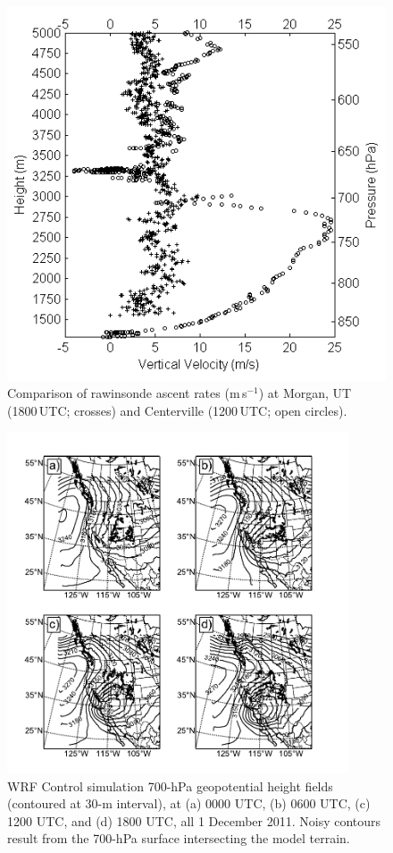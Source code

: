 \documentclass[pdftex,12pt]{article}
\def\mps{m\,s$^{-1}$}
\begin{document}
\begin{figure}[t]
\centering
\includegraphics[width=33pc,angle=0]{vertical_vel_crop}
\caption{Comparison of rawinsonde ascent rates (\mps) at Morgan, UT (1800\,UTC; crosses) and Centerville (1200\,UTC; open circles).}
\label{fig:ascent}
\end{figure}

\begin{figure}[t]
\centering
\includegraphics[width=0.9\textwidth]{WRF700.pdf}
\caption{WRF Control simulation 700-hPa geopotential height fields (contoured at 30-m interval), at (a) 0000 UTC, (b) 0600 UTC, (c) 1200 UTC, and (d) 1800 UTC, all 1 December 2011. Noisy contours result from the 700-hPa surface intersecting the model terrain.}
\label{fig:NAM-C_700}
\end{figure}
\end{document}
